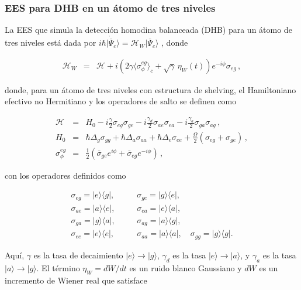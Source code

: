 \documentclass[12pt]{article}
\newcommand{\mcH}{\mathcal{H}}
\newcommand{\ket}[1]{\lvert #1 \rangle}
\newcommand{\bra}[1]{\langle #1 \rvert}
\begin{document}
\subsubsection{EES para DHB en un átomo de tres niveles}

La EES que simula la detección homodina balanceada (DHB) para un átomo de tres niveles está dada por $i \hbar \ket{\dot{\bar{\Psi}}_c} = {\mcH}_W \ket{\bar{\Psi}_c}$ \cite{Carm93,WisemanMilburn2009}, donde

\begin{eqnarray} \label{eq:HamiltonianHDm_3L}
\mcH_W &=& \mcH + i \left(2 \gamma \langle \sigma_{\phi}^{eg} \rangle_c  
	+ \sqrt{\gamma} \,\eta_W(t) \right) e^{-i\phi}  \sigma_{eg} \,,
\end{eqnarray}

donde, para un átomo de tres niveles con estructura de shelving, el Hamiltoniano efectivo no Hermitiano y los operadores de salto se definen como

\begin{eqnarray}
\mcH &=& H_0 - i \frac{\gamma}{2} \sigma_{eg}\sigma_{ge}
      - i \frac{\gamma_d}{2} \sigma_{ae}\sigma_{ea}
      - i \frac{\gamma_a}{2} \sigma_{ga}\sigma_{ag} \,, \quad
\nonumber \\
H_0 &=& \hbar \Delta_g \sigma_{gg} + \hbar \Delta_a \sigma_{aa} + \hbar \Delta_e \sigma_{ee} 
      + \frac{\Omega}{2} (\sigma_{eg} + \sigma_{ge}) \,,
\nonumber \\ 
\sigma_{\phi}^{eg}  
&=& \frac{1}{2}(\bar{\sigma}_{ge} e^{i\phi} + \bar{\sigma}_{eg} e^{-i\phi} ) \,,
\end{eqnarray}

con los operadores definidos como

\begin{eqnarray}
\sigma_{eg} = \ket{e}\bra{g}, &\quad& \sigma_{ge} = \ket{g}\bra{e}, \nonumber \\
\sigma_{ae} = \ket{a}\bra{e}, &\quad& \sigma_{ea} = \ket{e}\bra{a}, \nonumber \\
\sigma_{ga} = \ket{g}\bra{a}, &\quad& \sigma_{ag} = \ket{a}\bra{g}, \nonumber \\
\sigma_{ee} = \ket{e}\bra{e}, &\quad& \sigma_{aa} = \ket{a}\bra{a}, \quad \sigma_{gg} = \ket{g}\bra{g}.
\end{eqnarray}

Aquí, $\gamma$ es la tasa de decaimiento $\ket{e} \to \ket{g}$, $\gamma_d$ es la tasa $\ket{e} \to \ket{a}$, y $\gamma_a$ es la tasa $\ket{a} \to \ket{g}$. El término $\eta_W = dW/dt$ es un ruido blanco Gaussiano y $dW$ es un incremento de Wiener real que satisface
\end{document}
